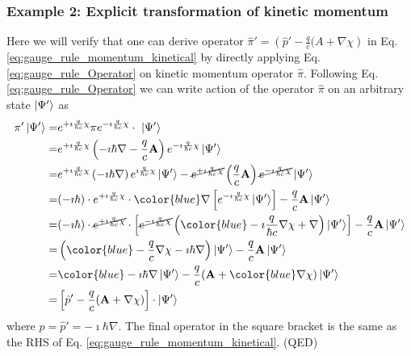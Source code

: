 \documentclass[11pt]{article}
\begin{document}
\subsubsection{Example 2: Explicit transformation of kinetic momentum  }

Here we will verify that one can  derive  operator  $\hat \pi'=\left(\hat p' -\frac{q}{c}(A+ \nabla \chi\right)$ in Eq. \ref{eq:gauge_rule_momentum_kinetical} by directly  applying Eq.  \ref{eq:gauge_rule_Operator} on  kinetic momentum operator $\hat \pi$.
Following  Eq.\ref{eq:gauge_rule_Operator} we can  write action of the operator $\hat \pi$ on an arbitrary state $\ket{\Psi'}$ as 
\begin{align*}
\pi' \ket{\Psi'} =& e^{+\imath \frac{q}{\hbar c} \chi} \pi  e^{-\imath \frac{q}{\hbar c} \chi} \cdot\ \ket{ \Psi'}\\
=& e^{+\imath \frac{q}{\hbar c} \chi} \left( -\imath  \hbar \nabla -\frac{q}{c} 
    \vb A \right)  e^{-\imath \frac{q}{\hbar c} \chi}\ket{ \Psi'}\\
=&e^{+\imath \frac{q}{\hbar c} \chi} \left( -\imath  \hbar \nabla \right)  
    e^{\imath \frac{q}{\hbar c} \chi}\ket{ \Psi'}
    - \cancel{e^{+\imath \frac{q}{\hbar c} \chi}} \left(\frac{q}{c} \vb A \right) \cancel{  e^{-\imath \frac{q}{\hbar c} \chi} }\ket{ \Psi'}\\
=& (-\imath \hbar) \cdot e^{+\imath \frac{q}{\hbar c} \chi}\cdot 
    {\color{blue} \nabla} \left[ e^{-\imath \frac{q}{\hbar c} \chi}\ket{ \Psi'} \right] 
    -\frac{q}{c}\vb A \ket{\Psi'} \\
=&  (-\imath \hbar) \cdot \cancel { e^{+\imath \frac{q}{\hbar c} \chi}}\cdot 
    \left[  \cancel{ e^{-\imath \frac{q}{\hbar c} \chi} } \left({\color{blue} -\imath \frac{q}{\hbar c} \nabla \chi + \nabla } \right) \ket{\Psi'} \right]   -\frac{q}{c}\vb A \ket{\Psi'} \\
=& \left({ \color{blue} -\frac{q}{c} \nabla \chi -\imath \hbar \nabla  } \right)
    \ket{\Psi'} -\frac{q}{c}\vb A \ket{\Psi'} \\
=&  {\color{blue}   -\imath \hbar \nabla } \ket{\Psi'}   -\frac{q}{c} (\vb  A + {\color{blue} \nabla \chi }) \ket{\Psi'} \\
=&  \left[ \hat p' - \frac{q}{c} (\vb A +\nabla \chi ) \right] \cdot \ket{\Psi'}
\end{align*}
where  $\hat p=\hat p'=-\imath \hbar \nabla$. 
The final operator in the square bracket is the same  as the RHS of Eq. \ref{eq:gauge_rule_momentum_kinetical}. (QED)
\end{document}
